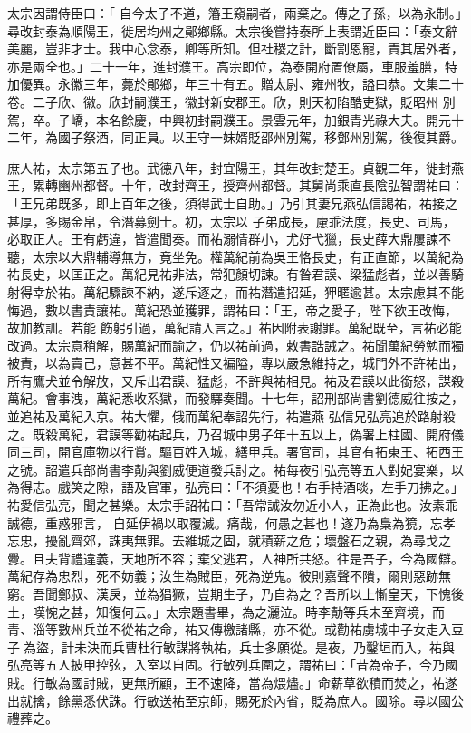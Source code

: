 \begin{pinyinscope}
 太宗因謂侍臣曰：「
 自今太子不道，籓王窺嗣者，兩棄之。傳之子孫，以為永制。」尋改封泰為順陽王，徙居均州之鄖鄉縣。太宗後嘗持泰所上表謂近臣曰：「泰文辭美麗，豈非才士。我中心念泰，卿等所知。但社稷之計，斷割恩寵，責其居外者，亦是兩全也。」二十一年，進封濮王。高宗即位，為泰開府置僚屬，車服羞膳，特加優異。永徽三年，薨於鄖鄉，年三十有五。贈太尉、雍州牧，謚曰恭。文集二十卷。二子欣、徽。欣封嗣濮王，徽封新安郡王。欣，則天初陷酷吏獄，貶昭州
 別駕，卒。子嶠，本名餘慶，中興初封嗣濮王。景雲元年，加銀青光祿大夫。開元十二年，為國子祭酒，同正員。以王守一妹婿貶邵州別駕，移鄧州別駕，後復其爵。



 庶人祐，太宗第五子也。武德八年，封宜陽王，其年改封楚王。貞觀二年，徙封燕王，累轉豳州都督。十年，改封齊王，授齊州都督。其舅尚乘直長陰弘智謂祐曰：「王兄弟既多，即上百年之後，須得武士自助。」乃引其妻兄燕弘信謁祐，祐接之甚厚，多賜金帛，令潛募劍士。初，太宗以
 子弟成長，慮乖法度，長史、司馬，必取正人。王有虧違，皆遣聞奏。而祐溺情群小，尤好弋獵，長史薛大鼎屢諫不聽，太宗以大鼎輔導無方，竟坐免。權萬紀前為吳王恪長史，有正直節，以萬紀為祐長史，以匡正之。萬紀見祐非法，常犯顏切諫。有昝君謨、梁猛彪者，並以善騎射得幸於祐。萬紀驟諫不納，遂斥逐之，而祐潛遣招延，狎暱逾甚。太宗慮其不能悔過，數以書責讓祐。萬紀恐並獲罪，謂祐曰：「王，帝之愛子，陛下欲王改悔，故加教訓。若能
 飭躬引過，萬紀請入言之。」祐因附表謝罪。萬紀既至，言祐必能改過。太宗意稍解，賜萬紀而諭之，仍以祐前過，敕書誥誡之。祐聞萬紀勞勉而獨被責，以為賣己，意甚不平。萬紀性又褊隘，專以嚴急維持之，城門外不許祐出，所有鷹犬並令解放，又斥出君謨、猛彪，不許與祐相見。祐及君謨以此銜怒，謀殺萬紀。會事洩，萬紀悉收系獄，而發驛奏聞。十七年，詔刑部尚書劉德威往按之，並追祐及萬紀入京。祐大懼，俄而萬紀奉詔先行，祐遣燕
 弘信兄弘亮追於路射殺之。既殺萬紀，君謨等勸祐起兵，乃召城中男子年十五以上，偽署上柱國、開府儀同三司，開官庫物以行賞。驅百姓入城，繕甲兵。署官司，其官有拓東王、拓西王之號。詔遣兵部尚書李勣與劉威便道發兵討之。祐每夜引弘亮等五人對妃宴樂，以為得志。戲笑之隙，語及官軍，弘亮曰：「不須憂也！右手持酒啖，左手刀拂之。」祐愛信弘亮，聞之甚樂。太宗手詔祐曰：「吾常誡汝勿近小人，正為此也。汝素乖誠德，重惑邪言，
 自延伊禍以取覆滅。痛哉，何愚之甚也！遂乃為梟為獍，忘孝忘忠，擾亂齊郊，誅夷無罪。去維城之固，就積薪之危；壞盤石之親，為尋戈之釁。且夫背禮違義，天地所不容；棄父逃君，人神所共怒。往是吾子，今為國讎。萬紀存為忠烈，死不妨義；汝生為賊臣，死為逆鬼。彼則嘉聲不隤，爾則惡跡無窮。吾聞鄭叔、漢戾，並為猖獗，豈期生子，乃自為之？吾所以上慚皇天，下愧後土，嘆惋之甚，知復何云。」太宗題書畢，為之灑泣。時李勣等兵未至齊境，而
 青、淄等數州兵並不從祐之命，祐又傳檄諸縣，亦不從。或勸祐虜城中子女走入豆子為盜，計未決而兵曹杜行敏謀將執祐，兵士多願從。是夜，乃鑿垣而入，祐與弘亮等五人披甲控弦，入室以自固。行敏列兵圍之，謂祐曰：「昔為帝子，今乃國賊。行敏為國討賊，更無所顧，王不速降，當為煨燼。」命薪草欲積而焚之，祐遂出就擒，餘黨悉伏誅。行敏送祐至京師，賜死於內省，貶為庶人。國除。尋以國公禮葬之。




\end{pinyinscope}
